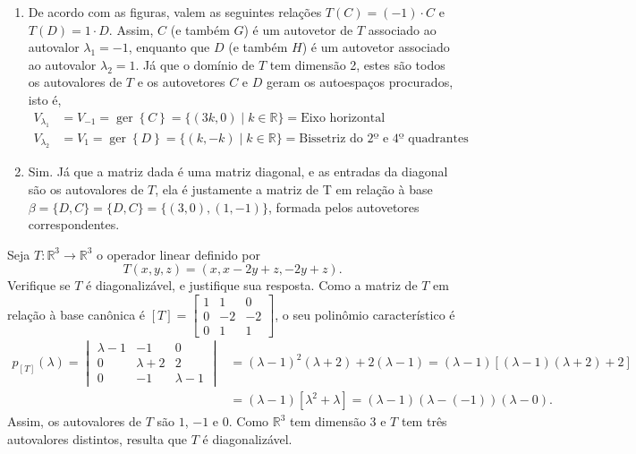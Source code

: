 \documentclass[12pt,a4paper]{article}
\newcommand*\ger[1]{\operatorname{ger}\left\{#1\right\}}
\newcommand*\R{\mathbb{R}}
\begin{document}
\begin{ExerciseList}
\Answer
\begin{enumerate}
\item De acordo com as figuras, valem as seguintes relações $T(C) = (-1) \cdot C$ e $T(D) = 1 \cdot D$. Assim, $C$ (e também $G$) é um autovetor de $T$ associado ao autovalor $\lambda_1 = -1$, enquanto que $D$ (e também $H$) é um autovetor associado ao autovalor $\lambda_2 = 1$. Já que o domínio de $T$ tem dimensão 2, estes são todos os autovalores de $T$ e os autovetores $C$ e $D$ geram os autoespaços procurados, isto é,
\begin{align*}
V_{\lambda_1}
& = V_{-1} = \ger{ C } = \{ (3k, 0) \mid k \in \R \} = \text{Eixo horizontal} \\
V_{\lambda_2}
& = V_{1} = \ger{ D } = \{ (k, -k) \mid k \in \R \} = \text{Bissetriz do 2º e 4º quadrantes}
\end{align*}

\item Sim. Já que a matriz dada é uma matriz diagonal, e as entradas da diagonal são os autovalores de $T$, ela é justamente a matriz de T em relação à base $\beta = \{ D, C \} = \{ D, C \} = \{ (3,0), (1,-1) \}$, formada pelos autovetores correspondentes.
\end{enumerate}

\Exercise[title={3,0}]
Seja $T : \R^3 \to \R^3$ o operador linear definido por
\[
T(x,y,z) = (x,x-2y+z,-2y+z).
\]
Verifique se $T$ é diagonalizável, e justifique sua resposta.
\Answer Como a matriz de $T$ em relação à base canônica é $[T] =
\begin{bmatrix}
1 &  1 &  0\\
0 & -2 & -2\\
0 &  1 &  1
\end{bmatrix}$, o seu polinômio característico é
\begin{align*}
p_{[T]}(\lambda)
= \begin{vmatrix}
\lambda - 1 &         -1 &            0\\
          0 & \lambda +2 &            2\\
          0 &         -1 &  \lambda - 1
\end{vmatrix}
& =(\lambda - 1)^2(\lambda +2)+2(\lambda - 1)
  =(\lambda - 1)[(\lambda - 1)(\lambda +2)+2]\\
&=(\lambda - 1)[\lambda^2 +\lambda]
 =(\lambda - 1)(\lambda -(-1))(\lambda-0).
\end{align*}
Assim, os autovalores de $T$ são $1$, $-1$ e $0$. Como $\R^3$ tem dimensão $3$ e $T$ tem três autovalores distintos, resulta que $T$ é diagonalizável.


\end{ExerciseList}
\end{document}
